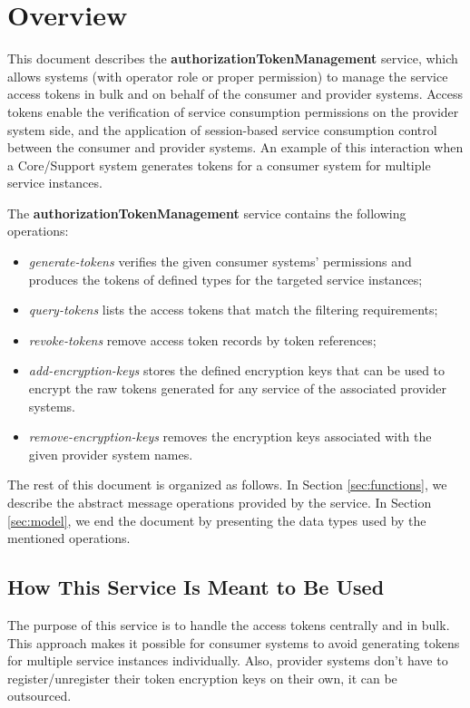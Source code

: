\documentclass[a4paper]{arrowhead}
\begin{document}
\section{Overview}
\label{sec:overview}
This document describes the \textbf{authorizationTokenManagement} service, which allows systems (with operator role or proper permission) to manage the service access tokens in bulk and on behalf of the consumer and provider systems. Access tokens enable the verification of service consumption permissions on the provider system side, and the application of session-based service consumption control between the consumer and provider systems. An example of this interaction when a Core/Support system generates tokens for a consumer system for multiple service instances.

The \textbf{authorizationTokenManagement} service contains the following operations:

\begin{itemize}
    \item \textit{generate-tokens} verifies the given consumer systems' permissions and produces the tokens of defined types for the targeted service instances;
    \item \textit{query-tokens} lists the access tokens that match the filtering requirements;
    \item \textit{revoke-tokens} remove access token records by token references;
    \item \textit{add-encryption-keys} stores the defined encryption keys that can be used to encrypt the raw tokens generated for any service of the associated provider systems.
    \item \textit{remove-encryption-keys} removes the encryption keys associated with the given provider system names.
\end{itemize}

The rest of this document is organized as follows.
In Section \ref{sec:functions}, we describe the abstract message operations provided by the service.
In Section \ref{sec:model}, we end the document by presenting the data types used by the mentioned operations.

\subsection{How This Service Is Meant to Be Used}

The purpose of this service is to handle the access tokens centrally and in bulk. This approach makes it possible for consumer systems to avoid generating tokens for multiple service instances individually. Also, provider systems don't have to register/unregister their token encryption keys on their own, it can be outsourced.
\end{document}
